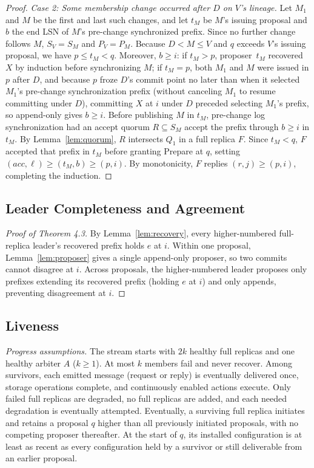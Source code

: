 \documentclass[sigconf,nonacm]{acmart}
\newcommand{\acc}{\mathit{acc}}
\begin{document}
\begin{proof}
\emph{Case 2: Some membership change occurred after \(D\) on \(V\)'s
lineage.}
Let \(M_1\) and \(M\) be the first and last such changes, and let
\(t_M\) be \(M\)'s issuing proposal and \(b\) the end LSN of \(M\)'s
pre-change synchronized prefix. Since no further change follows \(M\),
\(S_V=S_M\) and \(P_V=P_M\). Because \(D<M\le V\) and \(q\) exceeds
\(V\)'s issuing proposal, we have \(p\le t_M<q\). Moreover, \(b\ge i\): if \(t_M>p\), proposer~\(t_M\) recovered \(X\) by
induction before synchronizing \(M\); if \(t_M=p\), both \(M_1\) and
\(M\) were issued in \(p\) after \(D\), and because \(p\) froze \(D\)'s
commit point no later than when it selected \(M_1\)'s pre-change
synchronization prefix (without canceling \(M_1\) to resume committing
under \(D\)), committing \(X\) at \(i\) under \(D\) preceded selecting
\(M_1\)'s prefix, so append-only gives \(b\ge i\). Before publishing
\(M\) in \(t_M\), pre-change log synchronization had an accept quorum
\(R\subseteq S_M\) accept the prefix through \(b\ge i\) in \(t_M\). By
Lemma~\ref{lem:quorum}, \(R\) intersects \(Q_1\) in a full replica
\(F\). Since \(t_M<q\), \(F\) accepted that prefix in \(t_M\) before
granting Prepare at \(q\), setting \((\acc,\ell)\ge(t_M,b)\ge(p,i)\). By
monotonicity, \(F\) replies \((r,j)\ge(p,i)\), completing the induction.
\end{proof}

\balance
\subsection{Leader Completeness and Agreement}
\label{sec:agreement}
\begin{proof}[Proof of Theorem 4.3]
By Lemma~\ref{lem:recovery}, every higher-numbered full-replica leader's
recovered prefix holds \(e\) at \(i\). Within one proposal,
Lemma~\ref{lem:proposer} gives a single append-only proposer, so two
commits cannot disagree at \(i\). Across proposals, the higher-numbered
leader proposes only prefixes extending its recovered prefix (holding
\(e\) at \(i\)) and only appends, preventing disagreement at \(i\).
\end{proof}

\subsection{Liveness}
\label{sec:liveness}

\textit{Progress assumptions.} The stream starts with \(2k\) healthy
full replicas and one healthy arbiter \(A\) (\(k\ge 1\)). At most
\(k\) members fail and never recover. Among survivors, each emitted
message (request or reply) is eventually delivered once, storage
operations complete, and continuously enabled actions execute. Only
failed full replicas are degraded, no full replicas are added, and each
needed degradation is eventually attempted. Eventually, a surviving full
replica initiates and retains a proposal \(q\) higher than all
previously initiated proposals, with no competing proposer thereafter. At
the start of \(q\), its installed configuration is at least as recent as
every configuration held by a survivor or still deliverable from an
earlier proposal.
\end{document}
